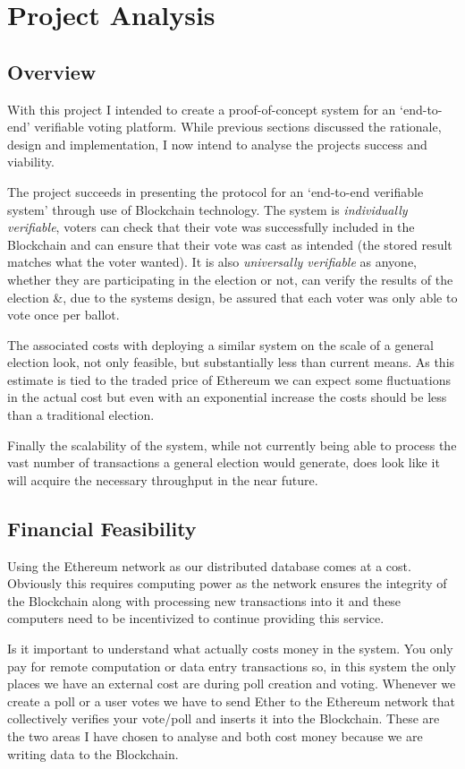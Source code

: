 \documentclass{article}
\begin{document}
    \section{Project Analysis}
    \subsection{Overview}
	With this project I intended to create a proof-of-concept system for an `end-to-end' verifiable voting platform. While previous sections discussed the rationale, design and implementation, I now intend to analyse the projects success and viability.

	The project succeeds in presenting the protocol for an `end-to-end verifiable system' through use of Blockchain technology. The system is \textit{individually verifiable}, voters can check that their vote was successfully included in the Blockchain and can ensure that their vote was cast as intended (the stored result matches what the voter wanted). It is also \textit{universally verifiable} as anyone, whether they are participating in the election or not, can verify the results of the election \&, due to the systems design, be assured that each voter was only able to vote once per ballot.
	
	The associated costs with deploying a similar system on the scale of a general election look, not only feasible, but substantially less than current means. As this estimate is tied to the traded price of Ethereum we can expect some fluctuations in the actual cost but even with an exponential increase the costs should be less than a traditional election.
	
	Finally the scalability of the system, while not currently being able to process the vast number of transactions a general election would generate, does look like it will acquire the necessary throughput in the near future.
	
    \clearpage
    \subsection{Financial Feasibility}
	Using the Ethereum network as our distributed database comes at a cost. Obviously this requires computing power as the network ensures the integrity of the Blockchain along with processing new transactions into it and these computers need to be incentivized to continue providing this service.
	
	Is it important to understand what actually costs money in the system. You only pay for remote computation or data entry transactions so, in this system the only places we have an external cost are during poll creation and voting. Whenever we create a poll or a user votes we have to send Ether to the Ethereum network that collectively verifies your vote/poll and inserts it into the Blockchain. These are the two areas I have chosen to analyse and both cost money because we are writing data to the Blockchain.
	
\end{document}
